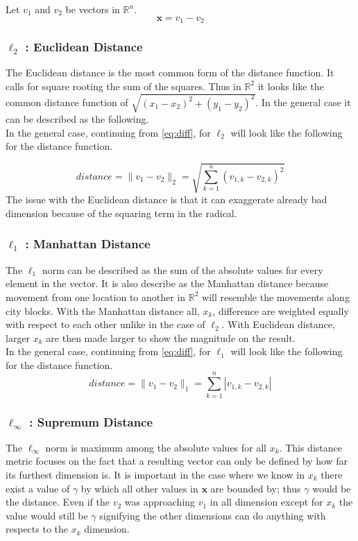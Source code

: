 \documentclass[a4paper,12pt]{article}
\numberwithin{equation}{section}
\begin{document}
Let $v_1$ and $v_2$ be vectors in  $\mathbb{R}^n$.
\begin{equation}
\textbf{x} = v_1-v_2
\label{eq:diff}  
\end{equation}

\subsubsection{$\ell_2$ : Euclidean Distance}
The Euclidean distance is the most common form of the distance function. It calls for square rooting the sum of the squares. Thus in $\mathbb{R}^2$ it looks like the common distance function of $\sqrt{(x_1-x_2)^2+(y_1-y_2)^2}$. In the general case it can be described as the following. \\

In the general case, continuing from \eqref{eq:diff}, for $\ell_2$ will look like the following for the distance function.

\begin{equation}
    distance =  \|v_1- v_2\|_2 = \sqrt{\sum_{k=1}^n (v_{1,k} - v_{2,k})^2}
\end{equation}
The issue with the Euclidean distance is that it can exaggerate already bad dimension because of the squaring term in the radical. 

\subsubsection{$\ell_1$ : Manhattan Distance}
The $\ell_1$ norm can be described as the sum of the absolute values for every element in the vector. It is also describe as the Manhattan distance because movement from one location to another in $\mathbb{R}^2$ will resemble the movements along city blocks. With the Manhattan distance all, $x_k$, difference are weighted equally with respect to each other unlike in the case of $\ell_2$. With Euclidean distance, larger $x_k$ are then made larger to show the magnitude on the result. \\

In the general case, continuing from \eqref{eq:diff}, for $\ell_1$ will look like the following for the distance function.
\begin{equation}
    distance =  \|v_1- v_2\|_1 = \sum_{k=1}^n |v_{1,k} - v_{2,k}|
\end{equation}

\subsubsection{$\ell_\infty$ : Supremum Distance}
The $\ell_\infty$ norm is maximum among the absolute values for all $x_k$. This distance metric focuses on the fact that a resulting vector can only be defined by how far its furthest dimension is. It is important in the case where we know in $x_k$ there exist a value of $\gamma$ by which all other values in $\textbf{x}$ are bounded by; thus $\gamma$ would be the distance. Even if the $v_2$ was approaching $v_1$ in all dimension except for $x_k$ the value would still be $\gamma$ signifying the other dimensions can do anything with respects to the $x_k$ dimension. \\
\end{document}
